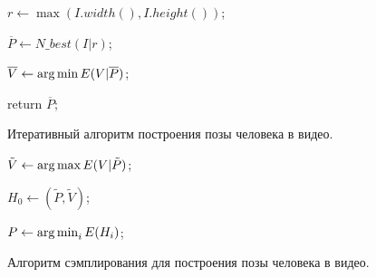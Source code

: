 \begin{algorithm}[H]
	\SetAlgoLined %
	
	
	
	$r \leftarrow \max(I.width(), I.height())$;
	
	$\overline{P} \leftarrow N\_best(I|r)$;
	
	$\overline{V} \leftarrow \operatorname*{arg\,min}{E(V|\overline{P})}$;
	

	return $\overline{P}$;
	
	\caption{Итеративный алгоритм построения позы человека в видео.}
	\label{alg:generalInit}
\end{algorithm}

\begin{algorithm}[H]
	\SetAlgoLined %
	
	
	
	$\tilde{V} \leftarrow \operatorname*{arg\,max}{E(V|\tilde{P})}$;
	
	$H_0 \leftarrow \left(\tilde{P}, \tilde{V} \right)$;
	

	$P \leftarrow \operatorname*{arg\,min}_i{E(H_i)}$;
	
	\caption{Алгоритм сэмплирования для построения позы человека в видео.}
	\label{alg:generalHM}
\end{algorithm}

